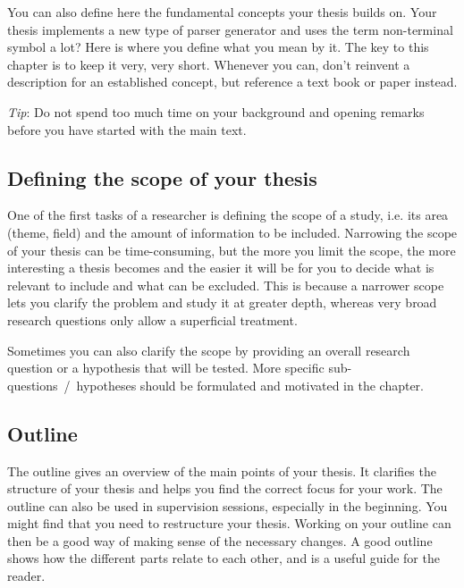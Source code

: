 You can also define here the fundamental concepts your thesis builds on. Your thesis implements a new type of parser generator and uses the term non-terminal symbol a lot? Here is where you define what you mean by it. The key to this chapter is to keep it very, very short. Whenever you can, don't reinvent a description for an established concept, but reference a text book or paper instead.
    
\emph{Tip}: Do not spend too much time on your background and opening remarks before you have started with the main text.

\subsection{Defining the scope of your thesis}
One of the first tasks of a researcher is defining the scope of a study, i.e. its area (theme, field) and the amount of information to be included. Narrowing the scope of your thesis can be time-consuming, but the more you limit the scope, the more interesting a thesis becomes and the easier it will be for you to decide what is relevant to include and what can be excluded. This is because a narrower scope lets you clarify the problem and study it at greater depth, whereas very broad research questions only allow a superficial treatment.

Sometimes you can also clarify the scope by providing an overall research question or a hypothesis that will be tested. More specific sub-questions~/~hypotheses should be formulated and motivated in the  chapter.
    
\subsection{Outline}
The outline gives an overview of the main points of your thesis. It clarifies the structure of your thesis and helps you find the correct focus for your work. The outline can also be used in supervision sessions, especially in the beginning. You might find that you need to restructure your thesis. Working on your outline can then be a good way of making sense of the necessary changes. A good outline shows how the different parts relate to each other, and is a useful guide for the reader.